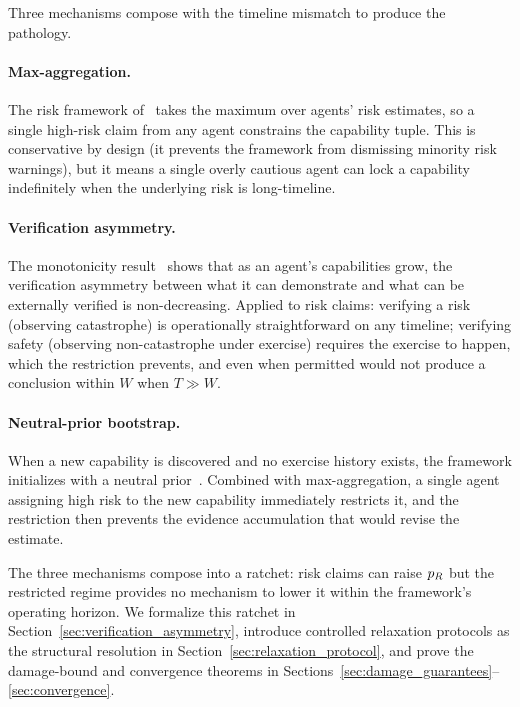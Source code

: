 Three mechanisms compose with the timeline mismatch to produce the
pathology.

\paragraph{Max-aggregation.}
The risk framework of~\citep{lasser2026horizon} takes the maximum
over agents' risk estimates, so a single high-risk claim from any
agent constrains the capability tuple.  This is conservative by
design (it prevents the framework from dismissing minority risk
warnings), but it means a single overly cautious agent can lock a
capability indefinitely when the underlying risk is long-timeline.

\paragraph{Verification asymmetry.}
The monotonicity
result~\citep[Proposition~1]{lasser2026exo} shows that as an
agent's capabilities grow, the verification asymmetry between what
it can demonstrate and what can be externally verified is
non-decreasing.  Applied to risk claims: verifying a risk (observing
catastrophe) is operationally straightforward on any timeline;
verifying safety (observing non-catastrophe under exercise) requires
the exercise to happen, which the restriction prevents, and even
when permitted would not produce a conclusion within $W$ when
$T \gg W$.

\paragraph{Neutral-prior bootstrap.}
When a new capability is discovered and no exercise history exists,
the framework initializes with a neutral
prior~\citep[Discussion]{lasser2026horizon}.  Combined with
max-aggregation, a single agent assigning high risk to the new
capability immediately restricts it, and the restriction then
prevents the evidence accumulation that would revise the estimate.

\medskip

The three mechanisms compose into a ratchet: risk claims can raise
$p_R$ but the restricted regime provides no mechanism to lower it
within the framework's operating horizon.
We formalize this ratchet in
Section~\ref{sec:verification_asymmetry}, introduce controlled
relaxation protocols as the structural resolution in
Section~\ref{sec:relaxation_protocol}, and prove the damage-bound
and convergence theorems in
Sections~\ref{sec:damage_guarantees}--\ref{sec:convergence}.

